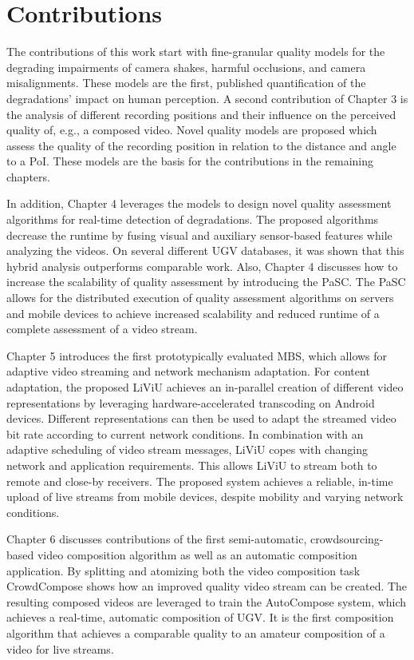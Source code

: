 \section{Contributions}
The contributions of this work start with fine-granular quality models for the degrading impairments of camera shakes, harmful occlusions, and camera misalignments.
These models are the first, published quantification of the degradations' impact on human perception.
A second contribution of Chapter 3 is the analysis of different recording positions and their influence on the perceived quality of, e.g., a composed video.
Novel quality models are proposed which assess the quality of the recording position in relation to the distance and angle to a \acf{PoI}.
These models are the basis for the contributions in the remaining chapters.

In addition, Chapter 4 leverages the models to design novel quality assessment algorithms for real-time detection of degradations.
The proposed algorithms decrease the runtime by fusing visual and auxiliary sensor-based features while analyzing the videos.
On several different \ac{UGV} databases, it was shown that this hybrid analysis outperforms comparable work.
Also, Chapter 4 discusses how to increase the scalability of quality assessment by introducing the \ac{PaSC}.
The \ac{PaSC} allows for the distributed execution of quality assessment algorithms on servers and mobile devices to achieve increased scalability and reduced runtime of a complete assessment of a video stream.

Chapter 5 introduces the first prototypically evaluated \ac{MBS}, which allows for adaptive video streaming and network mechanism adaptation.
For content adaptation, the proposed \ac{LiViU} achieves an in-parallel creation of different video representations by leveraging hardware-accelerated transcoding on Android devices.
Different representations can then be used to adapt the streamed video bit rate according to current network conditions.
In combination with an adaptive scheduling of video stream messages, \ac{LiViU} copes with changing network and application requirements.
This allows \ac{LiViU} to stream both to remote and close-by receivers.
The proposed system achieves a reliable, in-time upload of live streams from mobile devices, despite mobility and varying network conditions.

Chapter 6 discusses contributions of the first semi-automatic, crowdsourcing-based video composition algorithm as well as an automatic composition application. 
By splitting and atomizing both the video composition task CrowdCompose shows how an improved quality video stream can be created. 
The resulting composed videos are leveraged to train the AutoCompose system, which achieves a real-time, automatic composition of \ac{UGV}.
It is the first composition algorithm that achieves a comparable quality to an amateur composition of a video for live streams.


